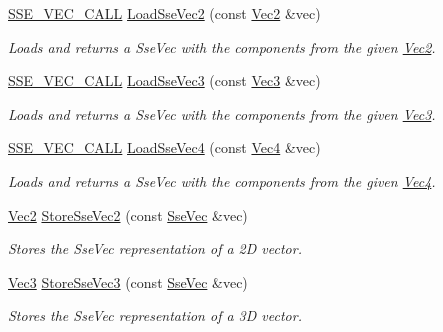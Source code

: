 \begin{DoxyCompactItemize}
\hyperlink{ssevec__math__defs_8h_a97454f977a5281455cecacce1e8ba670}{S\+S\+E\+\_\+\+V\+E\+C\+\_\+\+C\+A\+L\+L} \hyperlink{group___s_i_m_d_vec_math_gabe3a018b9d6a7bfd471e9e79c6d426b4}{Load\+Sse\+Vec2} (const \hyperlink{classgofxmath_1_1_vec2}{Vec2} \&vec)
\begin{DoxyCompactList}\small\item\em Loads and returns a Sse\+Vec with the components from the given \hyperlink{classgofxmath_1_1_vec2}{Vec2}. \end{DoxyCompactList}\item 
\hyperlink{ssevec__math__defs_8h_a97454f977a5281455cecacce1e8ba670}{S\+S\+E\+\_\+\+V\+E\+C\+\_\+\+C\+A\+L\+L} \hyperlink{group___s_i_m_d_vec_math_gae96ebc5e457de66eef7e98cd376091c6}{Load\+Sse\+Vec3} (const \hyperlink{classgofxmath_1_1_vec3}{Vec3} \&vec)
\begin{DoxyCompactList}\small\item\em Loads and returns a Sse\+Vec with the components from the given \hyperlink{classgofxmath_1_1_vec3}{Vec3}. \end{DoxyCompactList}\item 
\hyperlink{ssevec__math__defs_8h_a97454f977a5281455cecacce1e8ba670}{S\+S\+E\+\_\+\+V\+E\+C\+\_\+\+C\+A\+L\+L} \hyperlink{group___s_i_m_d_vec_math_gab6df575aef0bbd218edfd71d72595355}{Load\+Sse\+Vec4} (const \hyperlink{classgofxmath_1_1_vec4}{Vec4} \&vec)
\begin{DoxyCompactList}\small\item\em Loads and returns a Sse\+Vec with the components from the given \hyperlink{classgofxmath_1_1_vec4}{Vec4}. \end{DoxyCompactList}\item 
\hyperlink{classgofxmath_1_1_vec2}{Vec2} \hyperlink{group___s_i_m_d_vec_math_ga40c204913db7670aba5504b920c123ce}{Store\+Sse\+Vec2} (const \hyperlink{namespacegofxmath_a634570ddcd2496053ee966227080e02f}{Sse\+Vec} \&vec)
\begin{DoxyCompactList}\small\item\em Stores the Sse\+Vec representation of a 2\+D vector. \end{DoxyCompactList}\item 
\hyperlink{classgofxmath_1_1_vec3}{Vec3} \hyperlink{group___s_i_m_d_vec_math_gac4ff1b6370eaf567846d209b4068bc75}{Store\+Sse\+Vec3} (const \hyperlink{namespacegofxmath_a634570ddcd2496053ee966227080e02f}{Sse\+Vec} \&vec)
\begin{DoxyCompactList}\small\item\em Stores the Sse\+Vec representation of a 3\+D vector. \end{DoxyCompactList}\item 

\end{DoxyCompactItemize}
